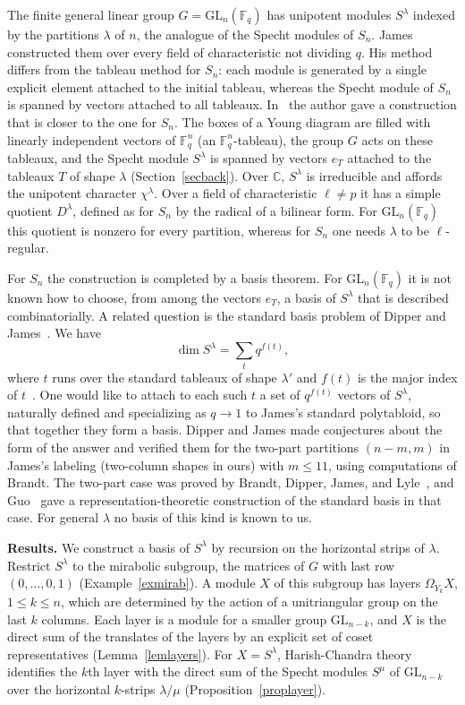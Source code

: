 \documentclass[11pt, letterpaper]{amsart}
\theoremstyle{definition}
\theoremstyle{remark}
\newcommand{\FF}{\mathbb{F}}
\newcommand{\CC}{\mathbb{C}}
\newcommand{\GL}{\mathrm{GL}}
\begin{document}
The finite general linear group $G=\GL_n(\FF_q)$ has unipotent modules $S^\lambda$ indexed by the partitions $\lambda$ of $n$, the analogue of the Specht modules of $S_n$. James~\cite{James84} constructed them over every field of characteristic not dividing $q$. His method differs from the tableau method for $S_n$: each module is generated by a single explicit element attached to the initial tableau, whereas the Specht module of $S_n$ is spanned by vectors attached to all tableaux. In~\cite{AN2} the author gave a construction that is closer to the one for $S_n$. The boxes of a Young diagram are filled with linearly independent vectors of $\FF_q^n$ (an $\FF_q^n$-tableau), the group $G$ acts on these tableaux, and the Specht module $S^\lambda$ is spanned by vectors $e_T$ attached to the tableaux $T$ of shape $\lambda$ (Section~\ref{secback}). Over $\CC$, $S^\lambda$ is irreducible and affords the unipotent character $\chi^\lambda$. Over a field of characteristic $\ell\ne p$ it has a simple quotient $D^\lambda$, defined as for $S_n$ by the radical of a bilinear form. For $\GL_n(\FF_q)$ this quotient is nonzero for every partition, whereas for $S_n$ one needs $\lambda$ to be $\ell$-regular.

For $S_n$ the construction is completed by a basis theorem. For $\GL_n(\FF_q)$ it is not known how to choose, from among the vectors $e_T$, a basis of $S^\lambda$ that is described combinatorially. A related question is the standard basis problem of Dipper and James~\cite{DJ}. We have
\[
\dim S^\lambda=\sum_{t}q^{f(t)},
\]
where $t$ runs over the standard tableaux of shape $\lambda'$ and $f(t)$ is the major index of $t$~\cite{Thomas}. One would like to attach to each such $t$ a set of $q^{f(t)}$ vectors of $S^\lambda$, naturally defined and specializing as $q\to1$ to James's standard polytabloid, so that together they form a basis. Dipper and James made conjectures about the form of the answer and verified them for the two-part partitions $(n-m,m)$ in James's labeling (two-column shapes in ours) with $m\le11$, using computations of Brandt. The two-part case was proved by Brandt, Dipper, James, and Lyle~\cite{BDJL}, and Guo~\cite{Guo,DG} gave a representation-theoretic construction of the standard basis in that case. For general $\lambda$ no basis of this kind is known to us.

\medskip
\noindent\textbf{Results.} We construct a basis of $S^\lambda$ by recursion on the horizontal strips of $\lambda$. Restrict $S^\lambda$ to the mirabolic subgroup, the matrices of $G$ with last row $(0,\dots,0,1)$ (Example~\ref{exmirab}). A module $X$ of this subgroup has layers $\Omega_{Y_k}X$, $1\le k\le n$, which are determined by the action of a unitriangular group on the last $k$ columns. Each layer is a module for a smaller group $\GL_{n-k}$, and $X$ is the direct sum of the translates of the layers by an explicit set of coset representatives (Lemma~\ref{lemlayers}). For $X=S^\lambda$, Harish-Chandra theory identifies the $k$th layer with the direct sum of the Specht modules $S^\mu$ of $\GL_{n-k}$ over the horizontal $k$-strips $\lambda/\mu$ (Proposition~\ref{proplayer}).
\end{document}
